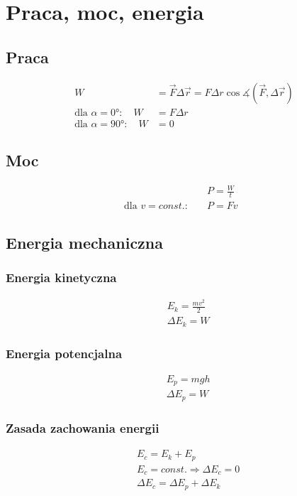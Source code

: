 \documentclass{article}
\newcommand{\F}{\vec{F}}
\begin{document}
  \section{Praca, moc, energia}
    \subsection{Praca}
      \begin{align*}
        W &= \F\Delta\vec{r} = F\Delta r \cos\measuredangle\left(\F, \Delta\vec{r}\right)\\
        \text{dla } \alpha = \ang{0}\colon\quad W &= F\Delta r\\
        \text{dla } \alpha = \ang{90}\colon\quad W &= 0
      \end{align*}
    \subsection{Moc}
      \begin{align*}
        &P = \frac{W}{t}\quad\\
      \text{dla }v = const.\colon\quad &P = Fv
      \end{align*}
    \subsection{Energia mechaniczna}
      \subsubsection{Energia kinetyczna}
        \begin{align*}
          &E_k = \frac{mv^2}{2}\\
          &\Delta E_k = W
        \end{align*}
      \subsubsection{Energia potencjalna}
        \begin{align*}
          &E_p = mgh\\
          &\Delta E_p = W
        \end{align*}
      \subsubsection{Zasada zachowania energii}
        \begin{align*}
          &E_c = E_k + E_p\\
          &E_c = const. \Rightarrow \Delta E_c = 0\\
          &\Delta E_c = \Delta E_p + \Delta E_k
        \end{align*}
\end{document}
